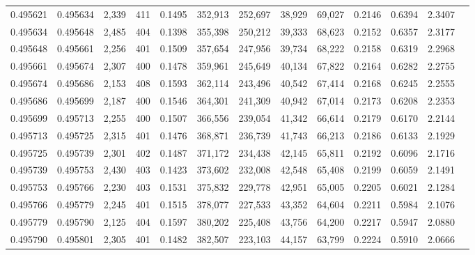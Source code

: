 \begin{tabular}{rrrrrrrrrrrrr}
0.495621 & 0.495634 & 2,339 & 411 &                                     0.1495 & 352,913 & 252,697 &  38,929 &  69,027 & 0.2146 & 0.6394 & 2.3407 \\
0.495634 & 0.495648 & 2,485 & 404 &                                     0.1398 & 355,398 & 250,212 &  39,333 &  68,623 & 0.2152 & 0.6357 & 2.3177 \\
0.495648 & 0.495661 & 2,256 & 401 &                                     0.1509 & 357,654 & 247,956 &  39,734 &  68,222 & 0.2158 & 0.6319 & 2.2968 \\
0.495661 & 0.495674 & 2,307 & 400 &                                     0.1478 & 359,961 & 245,649 &  40,134 &  67,822 & 0.2164 & 0.6282 & 2.2755 \\
0.495674 & 0.495686 & 2,153 & 408 &                                     0.1593 & 362,114 & 243,496 &  40,542 &  67,414 & 0.2168 & 0.6245 & 2.2555 \\
0.495686 & 0.495699 & 2,187 & 400 &                                     0.1546 & 364,301 & 241,309 &  40,942 &  67,014 & 0.2173 & 0.6208 & 2.2353 \\
0.495699 & 0.495713 & 2,255 & 400 &                                     0.1507 & 366,556 & 239,054 &  41,342 &  66,614 & 0.2179 & 0.6170 & 2.2144 \\
0.495713 & 0.495725 & 2,315 & 401 &                                     0.1476 & 368,871 & 236,739 &  41,743 &  66,213 & 0.2186 & 0.6133 & 2.1929 \\
0.495725 & 0.495739 & 2,301 & 402 &                                     0.1487 & 371,172 & 234,438 &  42,145 &  65,811 & 0.2192 & 0.6096 & 2.1716 \\
0.495739 & 0.495753 & 2,430 & 403 &                                     0.1423 & 373,602 & 232,008 &  42,548 &  65,408 & 0.2199 & 0.6059 & 2.1491 \\
0.495753 & 0.495766 & 2,230 & 403 &                                     0.1531 & 375,832 & 229,778 &  42,951 &  65,005 & 0.2205 & 0.6021 & 2.1284 \\
0.495766 & 0.495779 & 2,245 & 401 &                                     0.1515 & 378,077 & 227,533 &  43,352 &  64,604 & 0.2211 & 0.5984 & 2.1076 \\
0.495779 & 0.495790 & 2,125 & 404 &                                     0.1597 & 380,202 & 225,408 &  43,756 &  64,200 & 0.2217 & 0.5947 & 2.0880 \\
0.495790 & 0.495801 & 2,305 & 401 &                                     0.1482 & 382,507 & 223,103 &  44,157 &  63,799 & 0.2224 & 0.5910 & 2.0666 \\

\end{tabular}
